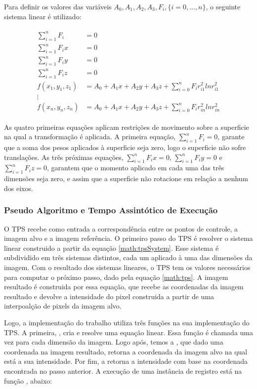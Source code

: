 Para definir os valores das variáveis $A_0, A_1, A_2, A_3, F_i, \{i = 0, ..., n\}$,
o seguinte sistema linear é utilizado:

\begin{align}\label{math:tpsSystem}
\begin{split}
    \sum_{i=1}^n F_i &= 0 \\
    \sum_{i=1}^n F_ix &= 0 \\
    \sum_{i=1}^n F_iy &= 0 \\
    \sum_{i=1}^n F_iz &= 0 \\
    f(x_1,y_1,z_1) &= A_0 + A_1x + A_2y + A_3z + \sum_{i=0}^n F_i r_{i1}^2 ln r_{i1}^2 \\
    \vdots \\
    f(x_n,y_n,z_n) &= A_0 + A_1x + A_2y + A_3z + \sum_{i=0}^n F_i r_{in}^2 ln r_{in}^2
\end{split}
\end{align}

  As quatro primeiras equações aplicam restrições de movimento sobre a
superficie na qual a transformação é aplicada. A primeira equação,
$\sum_{i=1}^n F_i = 0$, garante que a soma dos pesos aplicados à superficie
seja zero, logo o superficie não sofre translações. As três próximas equações,
$\sum_{i=1}^n F_ix = 0$, $\sum_{i=1}^n F_iy = 0$ e $\sum_{i=1}^n F_iz = 0$,
garantem que o momento aplicado em cada uma das três dimensões seja zero, e
assim que a superficie não rotacione em relação a nenhum dos eixos.

\subsubsection{Pseudo Algoritmo e Tempo Assintótico de Execução}

  O TPS recebe como entrada a correspondência entre os pontos de controle, a
imagem alvo e a imagem referência. O primeiro passo do TPS é resolver o
sistema linear construido a partir da equação \ref{math:tpsSystem}. Esse sistema
é subdividido em três sistemas distintos, cada um aplicado à uma das dimensões
da imagem. Com o resultado dos sistemas lineares, o TPS tem os valores
necessários para computar o próximo passo, dado pela equação \ref{math:tps}.
A imagem resultado é construida por essa equação, que recebe as coordenadas da
imagem resultado e devolve a intensidade do pixel construida a partir de uma
interpoalção de pixels da imagem alvo.

  Logo, a implementação do trabalho utiliza três funções na sua implementação
do TPS. A primeira, , cria e resolve uma equação
linear. Essa função é chamada uma vez para cada dimensão da imagem. Logo após,
temos a , que dado uma coordenada na imagem
resultado, retorna a coordenada da imagem alvo na qual está a sua intensidade.
Por fim, a  retorna a intensidade com base na
coordenada encontrada no passo anterior. A execução de uma instância de registro
está na função , abaixo:

